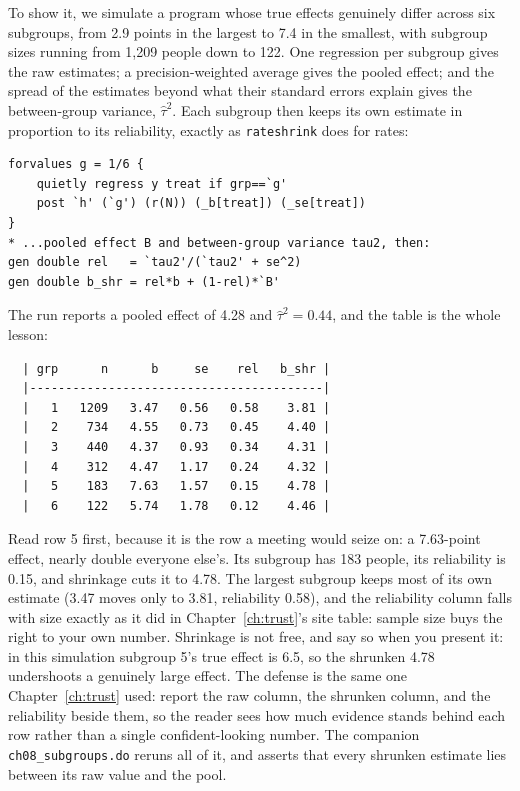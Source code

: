 \documentclass[
    a4paper,
    fontsize=10pt,
    twoside=true,
    numbers=noenddot,
]{kaobook}
\begin{document}
To show it, we simulate a program whose true effects genuinely differ across six subgroups, from 2.9 points in the largest to 7.4 in the smallest, with subgroup sizes running from 1{,}209 people down to 122. One regression per subgroup gives the raw estimates; a precision-weighted average gives the pooled effect; and the spread of the estimates beyond what their standard errors explain gives the between-group variance, $\hat\tau^2$. Each subgroup then keeps its own estimate in proportion to its reliability, exactly as \texttt{rateshrink} does for rates:
\par
{\footnotesize
\begin{verbatim}
forvalues g = 1/6 {
    quietly regress y treat if grp==`g'
    post `h' (`g') (r(N)) (_b[treat]) (_se[treat])
}
* ...pooled effect B and between-group variance tau2, then:
gen double rel   = `tau2'/(`tau2' + se^2)
gen double b_shr = rel*b + (1-rel)*`B'
\end{verbatim}
}
The run reports a pooled effect of 4.28 and $\hat\tau^2 = 0.44$, and the table is the whole lesson:
\par
{\footnotesize
\begin{verbatim}
  | grp      n      b     se    rel   b_shr |
  |-----------------------------------------|
  |   1   1209   3.47   0.56   0.58    3.81 |
  |   2    734   4.55   0.73   0.45    4.40 |
  |   3    440   4.37   0.93   0.34    4.31 |
  |   4    312   4.47   1.17   0.24    4.32 |
  |   5    183   7.63   1.57   0.15    4.78 |
  |   6    122   5.74   1.78   0.12    4.46 |
\end{verbatim}
}
Read row 5 first, because it is the row a meeting would seize on: a 7.63-point effect, nearly double everyone else's. Its subgroup has 183 people, its reliability is 0.15, and shrinkage cuts it to 4.78. The largest subgroup keeps most of its own estimate (3.47 moves only to 3.81, reliability 0.58), and the reliability column falls with size exactly as it did in Chapter~\ref{ch:trust}'s site table: sample size buys the right to your own number. Shrinkage is not free, and say so when you present it: in this simulation subgroup 5's true effect is 6.5, so the shrunken 4.78 undershoots a genuinely large effect. The defense is the same one Chapter~\ref{ch:trust} used: report the raw column, the shrunken column, and the reliability beside them, so the reader sees how much evidence stands behind each row rather than a single confident-looking number. The companion \texttt{ch08\_subgroups.do} reruns all of it, and asserts that every shrunken estimate lies between its raw value and the pool.
\end{document}
